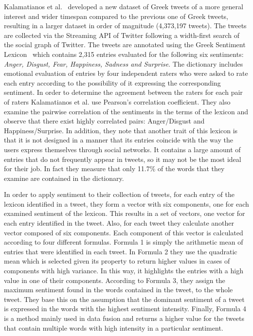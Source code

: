 Kalamatianos et al.~\cite{KMSA15} developed a new dataset of Greek tweets
of a more general interest and wider timespan
compared to the previous one of Greek tweets,
resulting in a larger dataset in order of magnitude (4,373,197 tweets).
The tweets are collected via the Streaming API of Twitter
following a width-first search of the social graph of Twitter.
The tweets are annotated using the Greek Sentiment Lexicon~\cite{TPK14}
which contains 2,315 entries evaluated for the following six sentiments:
\emph{Anger, Disgust, Fear, Happiness, Sadness and Surprise}.
The dictionary includes emotional evaluation of entries by four independent raters
who were asked to rate each entry according
to the possibility of it expressing the corresponding sentiment.
In order to determine the agreement between the raters for each pair of raters
Kalamatianos et al. use Pearson's correlation coefficient.
They also examine the pairwise correlation of the sentiments in the terms of the lexicon
and observe that there exist highly correlated pairs: Anger/Disgust and Happiness/Surprise.
In addition, they note that another trait of this lexicon is
that it is not designed in a manner that its entries coincide
with the way the users express themselves through social networks.
It contains a large amount of entries that do not frequently appear in tweets,
so it may not be the most ideal for their job.
In fact they measure that only 11.7\% of the words
that they examine are contained in the dictionary.

In order to apply sentiment to their collection of tweets,
for each entry of the lexicon identified in a tweet,
they form a vector with six components, one for each examined sentiment of the lexicon.
This results in a set of vectors, one vector for each entry identified in the tweet.
Also, for each tweet they calculate another vector composed of six components.
Each component of this vector is calculated according to four different formulas.
Formula 1 is simply the arithmetic mean of entries that were identified in each tweet.
In Formula 2 they use the quadratic mean which is selected given its property
to return higher values in cases of components with high variance.
In this way, it highlights the entries with a high value in one of their components.
According to Formula 3, they assign the maximum sentiment
found in the words contained in the tweet, to the whole tweet.
They base this on the assumption that the dominant sentiment of a tweet
is expressed in the words with the highest sentiment intensity.
Finally, Formula 4 is a method mainly used in data fusion
and returns a higher value for the tweets that contain multiple words
with high intensity in a particular sentiment.

